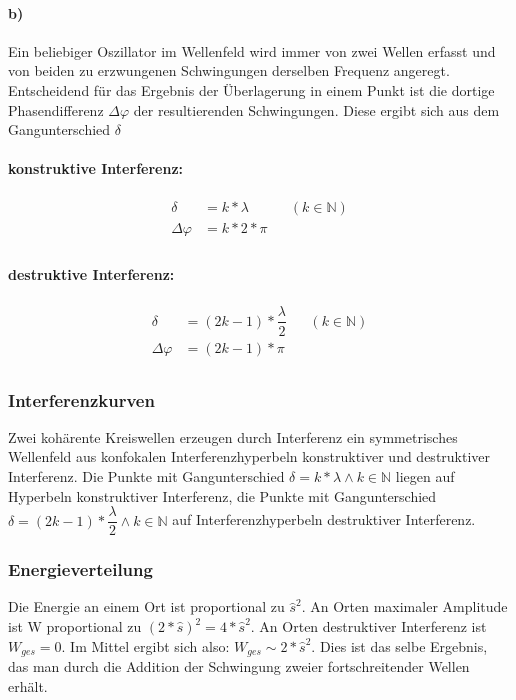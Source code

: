 \documentclass[12 pt]{article}
\numberwithin{equation}{section}
\begin{document}
	\paragraph{b)}
	Ein beliebiger Oszillator im Wellenfeld wird immer von zwei Wellen erfasst und von beiden zu erzwungenen Schwingungen derselben Frequenz angeregt.
	Entscheidend für das Ergebnis der Überlagerung in einem Punkt ist die dortige Phasendifferenz $\Delta \varphi$ der resultierenden Schwingungen. Diese ergibt sich aus dem Gangunterschied $\delta$
	\paragraph{konstruktive Interferenz:}
	\begin{align*}
		\delta&=k*\lambda&&(k\in\mathbb{N})\\
		\Delta\varphi&=k*2*\pi\\	
	\end{align*}
	\paragraph{destruktive Interferenz:}
	\begin{align*}
		\delta&=(2k-1)*\dfrac{\lambda}{2}&&(k\in\mathbb{N})\\
		\Delta\varphi&=(2k-1)*\pi\\
	\end{align*}
\subsubsection{Interferenzkurven} Zwei kohärente Kreiswellen erzeugen durch Interferenz ein symmetrisches Wellenfeld aus konfokalen Interferenzhyperbeln konstruktiver und destruktiver Interferenz. Die Punkte mit Gangunterschied $\delta=k*\lambda\land k\in\mathbb{N}$ liegen auf Hyperbeln konstruktiver Interferenz, die Punkte mit Gangunterschied $\delta=(2k-1)*\dfrac{\lambda}{2}\land k\in\mathbb{N}$ auf Interferenzhyperbeln destruktiver Interferenz.
\subsubsection{Energieverteilung} Die Energie an einem Ort ist proportional zu $\hat{s}^2$. An Orten maximaler Amplitude ist W proportional zu $(2*\hat{s})^2=4*\hat{s}^2$. An Orten destruktiver Interferenz ist $W_{ges}=0$. Im Mittel ergibt sich also: $W_{ges} \sim 2*\hat{s}^2$. Dies ist das selbe Ergebnis, das man durch die Addition der Schwingung zweier fortschreitender Wellen erhält.
\end{document}
